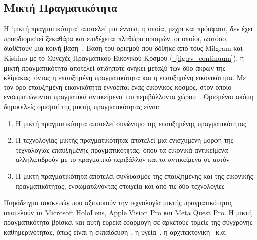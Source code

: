 \subsection{Μικτή Πραγματικότητα}\label{subsec:mixedReality}
Η `μικτή πραγματικότητα' αποτελεί μια έννοια, η οποία, μέχρι και πρόσφατα, δεν έχει προσδιοριστεί ξεκαθάρα και επιδέχεται πληθώρα ορισμών, οι οποίοι, ωστόσο, διαθέτουν μια κοινή βάση~\cite{speicher_2019_what}. Βάση του ορισμού που δόθηκε από τους Milgram και Kishino με το Συνεχές Πραγματικού-Εικονικού Κόσμου (\hyperref[fig:rv_continuum]{\schema~\ref*{fig:rv_continuum}}), η μικτή πραγματικότητα αποτελεί οτιδήποτε ανήκει μεταξύ των δύο άκρων της κλίμακας, όντας η επαυξημένη πραγματικότητα και η επαυξημένη εικονικότητα. Με τον όρο επαυξημένη εικονικότητα εννοείται ένας εικονικός κόσμος, στον οποίο ενσωματώνονται πραγματικά αντικείμενα του περιβάλλοντα χώρου~\cite{milgram_1994_augmented}. Ορισμένοι ακόμη δημοφιλείς ορισμοί της μικτής πραγματικότητας είναι:
\begin{enumerate}
    \item Η μικτή πραγματικότητα αποτελεί συνώνυμο της επαυξημένης πραγματικότητας
    \item Η τεχνολογίας μικτής πραγματικότητας αποτελεί μια ενισχυμένη μορφή της τεχνολογίας επαυξημένης πραγματικότητας, όπου τα εικονικά αντικείμενα αλληλεπιδρούν με το πραγματικό περιβάλλον και τα αντικείμενα σε αυτόν
    \item Η μικτή πραγματικότητα αποτελεί συνδυασμός της επαυξημένης και της εικονικής πραγματικότητας, ενσωματώνοντας στοιχεία και από τις δύο τεχνολογίες
\end{enumerate}
Παράδειγμα συσκευών που αξιοποιούν την τεχνολογία μικτής πραγματικότητας αποτελούν τα Microsoft HoloLens, Apple Vision Pro και Meta Quest Pro.
Η μικτή πραγματικότητα βρίσκει και αυτή ευρεία εφαρμογή σε αρκετούς τομείς της σύγχρονης καθημερινότητας, όπως είναι η εκπαίδευση~\cite{knierim_2018_challenges}\cite{liu_2007_mixed}, η υγεία~\cite{chen_2017_recent}\cite{tepper_2017_mixed}, η αρχιτεκτονική~\cite{wang_2008_mixed}\cite{dunston_2005_mixed} κ.α.